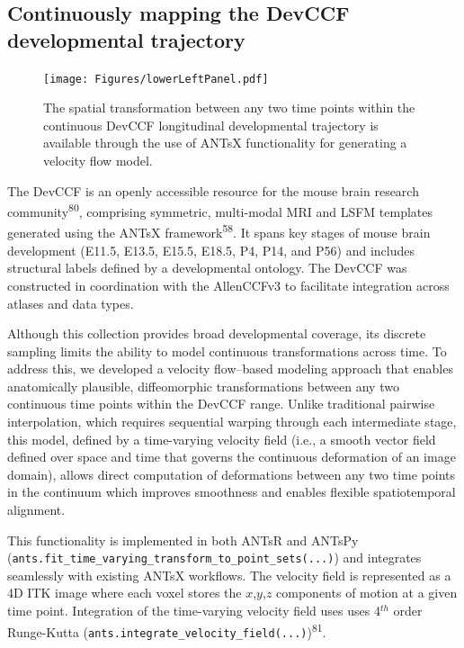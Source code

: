 \documentclass[
  12pt,
]{article}
\begin{document}
\subsection{Continuously mapping the DevCCF developmental
trajectory}\label{continuously-mapping-the-devccf-developmental-trajectory}

\begin{figure}
\centering
\texttt{[image: Figures/lowerLeftPanel.pdf]} \caption{The
spatial transformation between any two time points within the continuous DevCCF
longitudinal developmental trajectory is available through the use of ANTsX
functionality for generating a velocity flow model.}
\label{fig:devccfvelocity}
\end{figure}

The DevCCF is an openly accessible resource for the mouse brain research
community\textsuperscript{80}, comprising symmetric, multi-modal MRI and
LSFM templates generated using the ANTsX framework\textsuperscript{58}.
It spans key stages of mouse brain development (E11.5, E13.5, E15.5,
E18.5, P4, P14, and P56) and includes structural labels defined by a
developmental ontology. The DevCCF was constructed in coordination with
the AllenCCFv3 to facilitate integration across atlases and data types.

Although this collection provides broad developmental coverage, its
discrete sampling limits the ability to model continuous transformations
across time. To address this, we developed a velocity flow--based
modeling approach that enables anatomically plausible, diffeomorphic
transformations between any two continuous time points within the DevCCF
range. Unlike traditional pairwise interpolation, which requires
sequential warping through each intermediate stage, this model, defined
by a time-varying velocity field (i.e., a smooth vector field defined
over space and time that governs the continuous deformation of an image
domain), allows direct computation of deformations between any two time
points in the continuum which improves smoothness and enables flexible
spatiotemporal alignment.

This functionality is implemented in both ANTsR and ANTsPy
(\texttt{ants.fit\_time\_varying\_transform\_to\_point\_sets(...)}) and
integrates seamlessly with existing ANTsX workflows. The velocity field
is represented as a 4D ITK image where each voxel stores the
\(x\),\(y\),\(z\) components of motion at a given time point.
Integration of the time-varying velocity field uses uses 4\(^{th}\)
order Runge-Kutta
(\texttt{ants.integrate\_velocity\_field(...)})\textsuperscript{81}.
\end{document}
